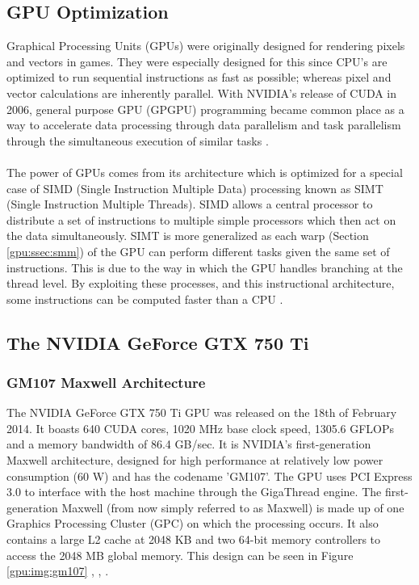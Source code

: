 \subsection{GPU Optimization}\label{gpu:sec:opt}
Graphical Processing Units (GPUs) were originally designed for rendering pixels and vectors in games. They were especially designed for this since CPU's are optimized to run sequential instructions as fast as possible; whereas pixel and vector calculations are inherently parallel. With NVIDIA's release of CUDA in 2006, general purpose GPU (GPGPU) programming became common place as a way to accelerate data processing through data parallelism and task parallelism through the simultaneous execution of similar tasks \citep{nvidia_cuda}.
\\
\\
The power of GPUs comes from its architecture which is optimized for a special case of SIMD (Single Instruction Multiple Data) processing known as SIMT (Single Instruction Multiple Threads). SIMD allows a central processor to distribute a set of instructions to multiple simple processors which then act on the data simultaneously. SIMT is more generalized as each warp (Section \ref{gpu:ssec:smm}) of the GPU can perform different tasks given the same set of instructions. This is due to the way in which the GPU handles branching at the thread level. By exploiting these processes, and this instructional architecture, some instructions can be computed faster than a CPU \citep{vuduc2013brief}.
\subsection{The NVIDIA GeForce GTX 750 Ti}\label{gpu:sec:750}
%
\subsubsection{GM107 Maxwell Architecture}\label{gpu:ssec:max}
The NVIDIA GeForce GTX 750 Ti GPU was released on the 18th of February 2014. It boasts 640 CUDA cores, 1020 MHz base clock speed, 1305.6 GFLOPs and a memory bandwidth of 86.4 GB/sec. It is NVIDIA's first-generation Maxwell architecture, designed for high performance at relatively low power consumption (60 W) and has the codename 'GM107'. The GPU uses PCI Express 3.0 to interface with the host machine through the GigaThread engine. The first-generation Maxwell (from now simply referred to as Maxwell) is made up of one Graphics Processing Cluster (GPC) on which the processing occurs. It also contains a large L2 cache at 2048 KB and two 64-bit memory controllers to access the 2048 MB global memory. This design can be seen in Figure \ref{gpu:img:gm107} \citep{geforce_750}, \citep{g750_specs}, \citep{g750_paper}.
%
